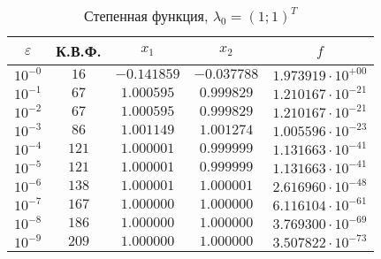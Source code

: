 \documentclass[a4paper,12pt,notitlepage,pdftex,headsepline]{scrartcl}
\begin{document}
        \begin{table}[ht]
          \centering
          \caption{Степенная функция, $\lambda_0 = (1; 1)^T$}
          \begin{tabular}{|c|c|c|c|c|}
            \hline
            $\varepsilon$ & К.В.Ф. & $x_1$ & $x_2$ & $f$\\
            \hline
            $10^{-0}$ & $16$ & $-0.141859$ & $-0.037788$ & $1.973919\cdot 10^{+00}$\\
            $10^{-1}$ & $67$ & $1.000595$ & $0.999829$ & $1.210167\cdot 10^{-21}$\\
            $10^{-2}$ & $67$ & $1.000595$ & $0.999829$ & $1.210167\cdot 10^{-21}$\\
            $10^{-3}$ & $86$ & $1.001149$ & $1.001274$ & $1.005596\cdot 10^{-23}$\\
            $10^{-4}$ & $121$ & $1.000001$ & $0.999999$ & $1.131663\cdot 10^{-41}$\\
            $10^{-5}$ & $121$ & $1.000001$ & $0.999999$ & $1.131663\cdot 10^{-41}$\\
            $10^{-6}$ & $138$ & $1.000001$ & $1.000001$ & $2.616960\cdot 10^{-48}$\\
            $10^{-7}$ & $167$ & $1.000000$ & $1.000000$ & $6.116104\cdot 10^{-61}$\\
            $10^{-8}$ & $186$ & $1.000000$ & $1.000000$ & $3.769300\cdot 10^{-69}$\\
            $10^{-9}$ & $209$ & $1.000000$ & $1.000000$ & $3.507822\cdot 10^{-73}$\\
            \hline
          \end{tabular}
        \end{table}
\end{document}
